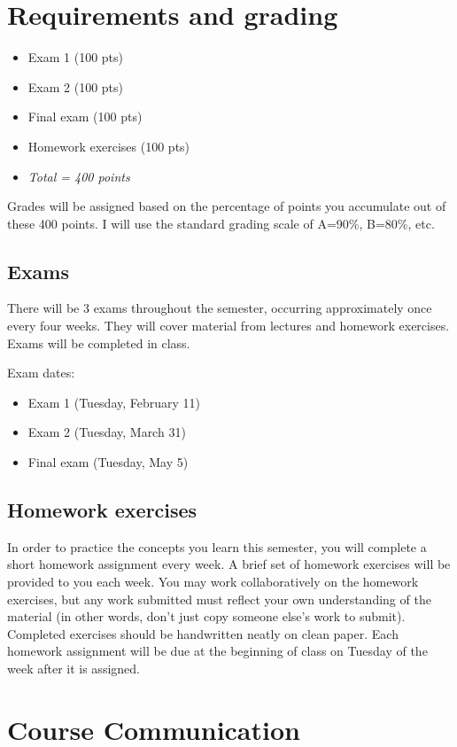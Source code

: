 \documentclass[10pt]{article}
\begin{document}
\section*{Requirements and grading}
\label{sec:orgdc3f998}
\begin{itemize}
\item Exam 1 (100 pts)
\item Exam 2 (100 pts)
\item Final exam (100 pts)
\item Homework exercises (100 pts)
\item \emph{Total = 400 points}
\end{itemize}

Grades will be assigned based on the percentage of points you accumulate out of these 400 points.  I will use the standard grading scale of A=90\%, B=80\%, etc.

\subsection*{Exams}
\label{sec:orgbfa722b}
There will be 3 exams throughout the semester, occurring approximately once every four weeks.  They will cover material from lectures and homework exercises. Exams will be completed in class.

Exam dates:

\begin{itemize}
\item Exam 1 (Tuesday, February 11)
\item Exam 2 (Tuesday, March 31)
\item Final exam (Tuesday, May 5)
\end{itemize}

\subsection*{Homework exercises}
\label{sec:org058f6a8}
In order to practice the concepts you learn this semester, you will complete a short homework assignment every week. A brief set of homework exercises will be provided to you each week. You may work collaboratively on the homework exercises, but any work submitted must reflect your own understanding of the material (in other words, don't just copy someone else's work to submit). Completed exercises should be handwritten neatly on clean paper. Each homework assignment will be due at the beginning of class on Tuesday of the week after it is assigned.

\section*{Course Communication}
\label{sec:org6335d55}
\end{document}
